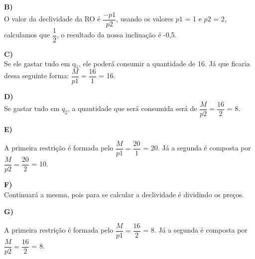 \documentclass[a4paper, 12pt]{article} %
\begin{document}
\begin{flushleft}
\textbf{B)}
\\
O valor da declividade da RO é $\dfrac{-p\textit{1}}{p\textit{2}}$, usando os valores $p\textit{1}$ = 1 e $p\textit{2}$ = 2, calculamos que $\dfrac{1}{2}$, o resultado da nossa inclinação é -0,5.
\singlespacing

\textbf{C)}
\\
Se ele gastar tudo em q$_{1}$, ele poderá consumir a quantidade de 16. Já que ficaria dessa seguinte forma: $\dfrac{M}{p\textit{1}} = \dfrac{16}{1}$ = 16. 
\singlespacing

\textbf{D)}
\\
Se gastar tudo em $q_{2}$, a quantidade que será consumida será de $\dfrac{M}{p\textit{2}} = \dfrac{16}{2}$ = 8.
\singlespacing

\textbf{E)}
\\
\begin{center}

A primeira restrição é formada pelo $\dfrac{M}{p\textit{1}} = \dfrac{20}{1}$ = 20. 
\singlespacing
Já a segunda é composta por $\dfrac{M}{p\textit{2}} = \dfrac{20}{2}$ = 10.

\end{center}
\singlespacing

\textbf{F)}
\\
Continuará a mesma, pois para se calcular a declividade é dividindo os preços.
\singlespacing

\textbf{G)}

\begin{center}

A primeira restrição é formada pelo $\dfrac{M}{p\textit{1}} = \dfrac{16}{2}$ = 8. 
\singlespacing
Já a segunda é composta por $\dfrac{M}{p\textit{2}} = \dfrac{16}{2}$ = 8.


\end{center}
\end{flushleft}
\end{document}
